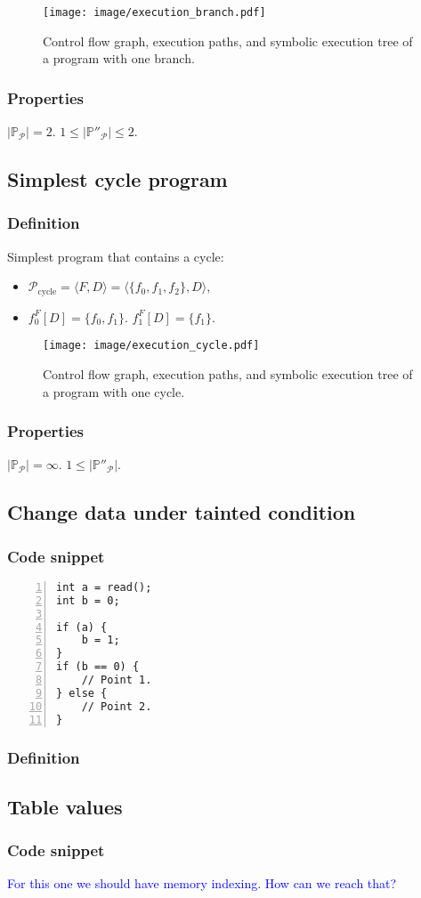 \documentclass[fleqn,oneside,a4]{article}
\newcommand{\sublevel}{\subsection}
\newcommand{\subsublevel}{\subsubsection}
\newcommand{\comment}[1]{\textcolor{blue}{#1}}  %
\begin{document}
\begin{figure}[h!]
    \begin{center}
        \texttt{[image: image/execution\_branch.pdf]}
    \end{center}
    \caption{Control flow graph, execution paths,
        and symbolic execution tree of a program with one branch.}
\end{figure}

\subsublevel{Properties}

$|\mathds{P}_\mathcal{P}| = 2$.
$1 \le |\mathds{P}''_\mathcal{P}| \le 2$.

\sublevel{Simplest cycle program}

\subsublevel{Definition}

Simplest program that contains a cycle:
\begin{itemize}
    \item $\mathcal{P}_{\text{cycle}} = \langle F, D \rangle =
        \langle \{f_0, f_1, f_2\}, D \rangle$,
    \item $f_0^F[D] = \{f_0, f_1\}$. $f_1^F[D] = \{f_1\}$.
\end{itemize}

\begin{figure}[h!]
    \begin{center}
        \texttt{[image: image/execution\_cycle.pdf]}
    \end{center}
    \caption{Control flow graph, execution paths,
        and symbolic execution tree of a program with one cycle.}
\end{figure}

\subsublevel{Properties}

$|\mathds{P}_\mathcal{P}| = \infty$.
$1 \le |\mathds{P}''_\mathcal{P}|$.

\sublevel{Change data under tainted condition}

\subsublevel{Code snippet}

\begin{lstlisting}[numbers=left,numberstyle=\scriptsize]
int a = read();
int b = 0;

if (a) {
    b = 1;
}
if (b == 0) {
    // Point 1.
} else {
    // Point 2.
}
\end{lstlisting}

\subsublevel{Definition}

\sublevel{Table values}

\subsublevel{Code snippet}

\comment{For this one we should have memory indexing.
How can we reach that?}
\end{document}
